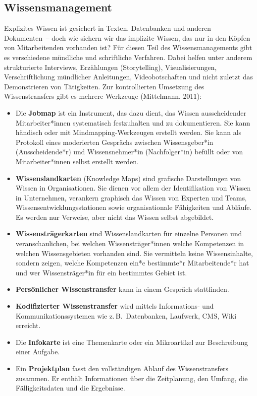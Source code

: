 \documentclass[
  11pt,
  letterpaper,
  DIV=11,
  twoside]{scrreprt}
\begin{document}
\subsection{Wissensmanagement}\label{wissensmanagement}

Explizites Wissen ist gesichert in Texten, Datenbanken und anderen
Dokumenten~-- doch wie sichern wir das implizite Wissen, das nur in den
Köpfen von Mitarbeitenden vorhanden ist? Für diesen Teil des
Wissensmanagements gibt es verschiedene mündliche und schriftliche
Verfahren. Dabei helfen unter anderem strukturierte Interviews,
Erzählungen (Storytelling), Visualisierungen, Verschriftlichung
mündlicher Anleitungen, Videobotschaften und nicht zuletzt das
Demonstrieren von Tätigkeiten. Zur kontrollierten Umsetzung des
Wissenstransfers gibt es mehrere Werkzeuge (Mittelmann, 2011):

\begin{itemize}
\item
  Die \textbf{Jobmap} ist ein Instrument, das dazu dient, das Wissen
  ausscheidender Mitarbeiter*innen systematisch festzuhalten und zu
  dokumentieren. Sie kann händisch oder mit Mindmapping-Werkzeugen
  erstellt werden. Sie kann als Protokoll eines moderierten Gesprächs
  zwischen Wissensgeber*in (Ausscheidende*r) und Wissensnehmer*in
  (Nachfolger*in) befüllt oder von Mitarbeiter*innen selbst erstellt
  werden.
\item
  \textbf{Wissenslandkarten} (Knowledge Maps) sind grafische
  Darstellungen von Wissen in Organisationen. Sie dienen vor allem der
  Identifikation von Wissen in Unternehmen, verankern graphisch das
  Wissen von Experten und Teams, Wissensentwicklungsstationen sowie
  organisationale Fähigkeiten und Abläufe. Es werden nur Verweise, aber
  nicht das Wissen selbst abgebildet.
\item
  \textbf{Wissensträgerkarten} sind Wissenslandkarten für einzelne
  Personen und veranschaulichen, bei welchen Wissensträger*innen welche
  Kompetenzen in welchen Wissensgebieten vorhanden sind. Sie vermitteln
  keine Wissensinhalte, sondern zeigen, welche Kompetenzen ein*e
  bestimmte*r Mitarbeitende*r hat und wer Wissensträger*in für ein
  bestimmtes Gebiet ist.
\item
  \textbf{Persönlicher Wissenstransfer} kann in einem Gespräch
  stattfinden.
\item
  \textbf{Kodifizierter Wissenstransfer} wird mittels Informations- und
  Kommunikationssystemen wie z.\,B.~Datenbanken, Laufwerk, CMS, Wiki
  erreicht.
\item
  Die \textbf{Infokarte} ist eine Themenkarte oder ein Mikroartikel zur
  Beschreibung einer Aufgabe.
\item
  Ein \textbf{Projektplan} fasst den vollständigen Ablauf des
  Wissenstransfers zusammen. Er enthält Informationen über die
  Zeitplanung, den Umfang, die Fälligkeitsdaten und die Ergebnisse.
\end{itemize}
\end{document}
